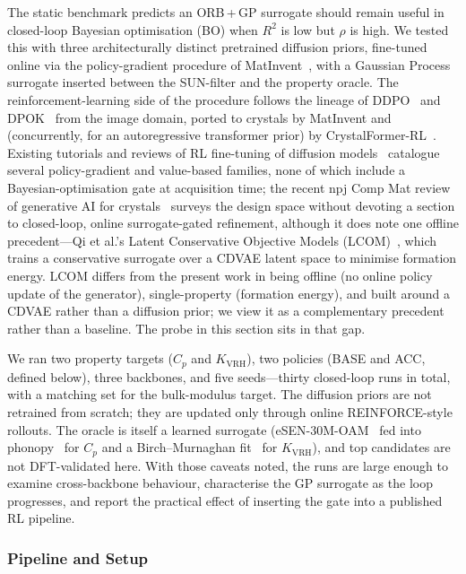 The static benchmark predicts an ORB\,+\,GP surrogate should remain useful in closed-loop Bayesian optimisation (BO) when $R^{2}$ is low but $\rho$ is high.
We tested this with three architecturally distinct pretrained diffusion priors, fine-tuned online via the policy-gradient procedure of MatInvent~\cite{chen2025matinvent}, with a Gaussian Process surrogate inserted between the SUN-filter and the property oracle.
The reinforcement-learning side of the procedure follows the lineage of DDPO~\cite{black2023ddpo} and DPOK~\cite{fan2023dpok} from the image domain, ported to crystals by MatInvent and (concurrently, for an autoregressive transformer prior) by CrystalFormer-RL~\cite{cao2025crystalformerrl}.
Existing tutorials and reviews of RL fine-tuning of diffusion models~\cite{uehara2024rldiffusion} catalogue several policy-gradient and value-based families, none of which include a Bayesian-optimisation gate at acquisition time; the recent npj Comp Mat review of generative AI for crystals~\cite{generative_review_2025} surveys the design space without devoting a section to closed-loop, online surrogate-gated refinement, although it does note one offline precedent---Qi et al.'s Latent Conservative Objective Models (LCOM)~\cite{qi2023lcom}, which trains a conservative surrogate over a CDVAE latent space to minimise formation energy.
LCOM differs from the present work in being offline (no online policy update of the generator), single-property (formation energy), and built around a CDVAE rather than a diffusion prior; we view it as a complementary precedent rather than a baseline.
The probe in this section sits in that gap.

We ran two property targets ($C_p$ and $K_{\text{VRH}}$), two policies (BASE and ACC, defined below), three backbones, and five seeds---thirty closed-loop runs in total, with a matching set for the bulk-modulus target.
The diffusion priors are not retrained from scratch; they are updated only through online REINFORCE-style rollouts.
The oracle is itself a learned surrogate (eSEN-30M-OAM~\cite{uma2025} fed into phonopy~\cite{togo2015first} for $C_p$ and a Birch--Murnaghan fit~\cite{birch1947finite} for $K_{\text{VRH}}$), and top candidates are not DFT-validated here.
With those caveats noted, the runs are large enough to examine cross-backbone behaviour, characterise the GP surrogate as the loop progresses, and report the practical effect of inserting the gate into a published RL pipeline.

\subsubsection{Pipeline and Setup}
\label{sec:cl_pipeline}

